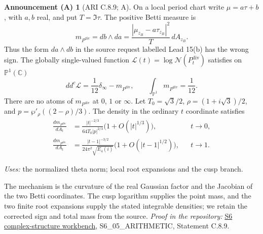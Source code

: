 \documentclass[11pt,a4paper]{article}
\theoremstyle{plain}
\theoremstyle{definition}
\newtheorem{announcement}[theorem]{Announcement (A)}
\newcommand{\C}{\mathbb C}
\begin{document}
\begin{announcement}[ARI C.8.9; A]\label{ari:C.8.9}
On a local period chart write $\mu=a\tau+b$, with $a,b$ real,
and put $T=\Im\tau$. The positive Betti measure is
\[
 m_{P^{\mathrm{div}}}=db\wedge da
 =\frac{|\mu_{z_B}-a\tau_{z_B}|^2}{T}\,dA_{z_B}.
\]
Thus the form $da\wedge db$ in the source request labelled Lead 15(b) has the wrong sign.
The globally single-valued function $\mathcal L(t)=\log \mathcal N(P^{\mathrm{div}}_t)$ satisfies
on $\mathbb{P}^1(\C)$
\begin{equation}\label{ari:eq:ca-current}
 dd^c\mathcal L=\frac1{12}\delta_\infty-m_{P^{\mathrm{div}}},\qquad
               \int_{\mathbb{P}^1}m_{P^{\mathrm{div}}}=\frac1{12}.
\end{equation}
There are no atoms of $m_{P^{\mathrm{div}}}$ at $0$, $1$ or $\infty$.
Let $T_0=\sqrt3/2$, $\rho=(1+i\sqrt3)/2$, and
$p=\wp'_\rho((2-\rho)/3)$. The density in the ordinary
$t$ coordinate satisfies
\begin{align}
 \frac{dm_{P^{\mathrm{div}}}}{dA_t}
 &=\frac{|t|^{-2/3}}{64T_0|p|^{2/3}}
                      \bigl(1+O(|t|^{1/3})\bigr),
                         &&t\longrightarrow0,\label{ari:eq:ca-density0}\\
 \frac{dm_{P^{\mathrm{div}}}}{dA_t}
 &=\frac{|t-1|^{-3/2}}{24\pi^2\sqrt{E_4(i)}}
                      \bigl(1+O(|t-1|^{1/2})\bigr),
                         &&t\longrightarrow1.\label{ari:eq:ca-density1}
\end{align}
\end{announcement}
\noindent\textit{Uses:} the normalized theta norm; local root expansions and the cusp branch.\par
The mechanism is the curvature of the real Gaussian factor and the Jacobian of the two Betti coordinates. The cusp logarithm supplies the point mass, and the two finite root expansions supply the stated integrable densities; we retain the corrected sign and total mass from the source.
\noindent\textit{Proof in the repository:} \href{https://github.com/KokunoYumeto/s6-complex-structure-workbench}{S6 complex-structure workbench}, S6\_05\_ARITHMETIC, Statement C.8.9.
\end{document}
